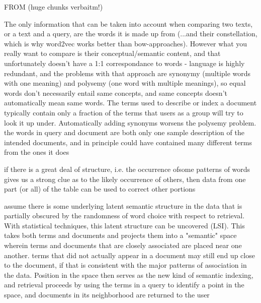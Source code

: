 


FROM \cite{deerwester} (huge chunks verbaitm!)

The only information that can be taken into account when comparing two texts, or a text and a query, are the words it is made up from (...and their constellation, which is why \gls{word2vec} works better than \gls{bow}-approaches). 
However what you really want to compare is their conceptual/semantic content, and that unfortunately doesn't have a 1:1 correspondance to words - language is highly redundant, and the problems with that approach are synonymy (multiple words with one meaning) and polysemy (one word with multiple meanings), so equal words don't necessarily entail same concepts, and same concepts doesn't automatically mean same words. The terms used to describe or index a document typically contain only a fraction of the terms that users as a group will try to look it up under. Automatically adding synonyms worsens the polysemy problem. the words in query and document are both only one sample description of the intended documents, and in principle could have contained many different terms from the ones it does

if there is a great deal of structure, i.e. the occurrence ofsome patterns of words gives us a strong clue as to the likely occurrence of others, then data from one part (or all) of the table can be used to correct other portions

assume there is some underlying latent semantic structure in the data that is partially obscured by the randomness of word choice with respect to retrieval. With statistical techniques, this latent structure can be uncovered (LSI). This takes both terms and documents and projects them into a "semantic" space wherein terms and documents that are closely associated are placed near one another. terms that did not actually appear in a document may still end up close to the document, if that is consistent with the major patterns of association in the data. Position in the space then serves as the new kind of semantic indexing, and retrieval proceeds by using the terms in a query to identify a point in the space, and documents in its neighborhood are returned to the user

